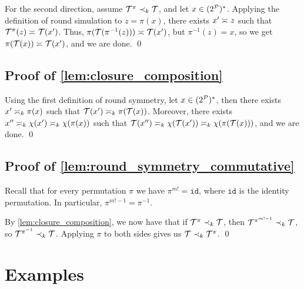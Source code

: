     For the second direction, assume $\cT^\pi \prec_k \cT$, and let $x\in (2^{\cP})^*$. Applying the definition of round simulation to $z=\pi(x)$, there exists $x'\req z$ such that $\cT^{\pi}(z)\req \cT(x')$. Thus, $\pi(\cT(\pi^{-1}(z)))\req \cT(x')$, but $\pi^{-1}(z)=x$, so we get $\pi(\cT(x))\req \cT(x')$, and we are done. \qed


\subsection{Proof of \autoref{lem:closure_composition}}
\label{apx:closure_composition}
Using the first definition of round symmetry, let $x\in (2^{\cP})^*$, then there exists $x'\req[k] \pi(x)$ such that $\cT(x')\req[k] \pi(\cT(x))$. Moreover, there exists $x''\req[k] \chi(x') \req[k] \chi(\pi(x))$ such that $\cT(x'')\req[k] \chi(\cT(x'))\req[k] \chi(\pi(\cT(x)))$, and we are done. \qed

\subsection{Proof of \autoref{lem:round_symmetry_commutative}}
\label{apx:round_symmetry_commutative}
Recall that for every permutation $\pi$ we have $\pi^{m!}=\mathtt{id}$, where $\mathtt{id}$ is the identity permutation. In particular, $\pi^{m!-1}=\pi^{-1}$. 

By \autoref{lem:closure_composition}, we now have that if $\cT^{\pi}\prec_k \cT$, then $\cT^{\pi^{m!-1}}\prec_k \cT$, so $\cT^{\pi^{-1}}\prec_k \cT$. Applying $\pi$ to both sides gives us $\cT\prec_k \cT^{\pi}$. \qed

\section{Examples}

